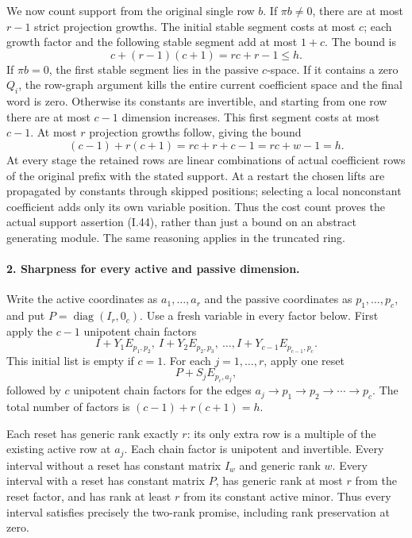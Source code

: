 \documentclass[11pt,a4paper]{article}
\theoremstyle{definition}\newtheorem{definition}{Definition}
\begin{document}
We now count support from the original single row $b$.
If $\pi b\ne0$, there are at most $r-1$ strict projection
growths.  The initial stable segment costs at most $c$;
each growth factor and the following stable segment add at
most $1+c$.  The bound is
\[
 c+(r-1)(c+1)=rc+r-1\le h.
\]
If $\pi b=0$, the first stable segment lies in the passive
$c$-space.  If it contains a zero $Q_i$, the row-graph
argument kills the entire current coefficient space and the
final word is zero.  Otherwise its constants are invertible,
and starting from one row there are at most $c-1$ dimension
increases.  This first segment costs at most $c-1$.
At most $r$ projection growths follow, giving the bound
\[
 (c-1)+r(c+1)=rc+r+c-1=rc+w-1=h.
\]
At every stage the retained rows are linear combinations of
actual coefficient rows of the original prefix with the
stated support.  At a restart the chosen lifts are propagated
by constants through skipped positions; selecting a local
nonconstant coefficient adds only its own variable position.
Thus the cost count proves the actual support assertion
(I.44), rather than just a bound on an abstract generating
module.  The same reasoning applies in the truncated ring.

\paragraph{2. Sharpness for every active and passive dimension.}
Write the active coordinates as $a_1,\ldots,a_r$ and the
passive coordinates as $p_1,\ldots,p_c$, and put
$P=\operatorname{diag}(I_r,0_c)$.
Use a fresh variable in every factor below.
First apply the $c-1$ unipotent chain factors
\[
 I+Y_1E_{p_1,p_2},\ I+Y_2E_{p_2,p_3},\ \ldots,
 I+Y_{c-1}E_{p_{c-1},p_c}.
\]
This initial list is empty if $c=1$.
For each $j=1,\ldots,r$, apply one reset
\[
 P+S_jE_{p_c,a_j},
\]
followed by $c$ unipotent chain factors for the edges
$a_j\to p_1\to p_2\to\cdots\to p_c$.
The total number of factors is
$(c-1)+r(c+1)=h$.

Each reset has generic rank exactly $r$: its only extra
row is a multiple of the existing active row at $a_j$.
Each chain factor is unipotent and invertible.  Every
interval without a reset has constant matrix $I_w$ and
generic rank $w$.  Every interval with a reset has constant
matrix $P$, has generic rank at most $r$ from the reset
factor, and has rank at least $r$ from its constant active
minor.  Thus every interval satisfies precisely the
two-rank promise, including rank preservation at zero.
\end{document}
